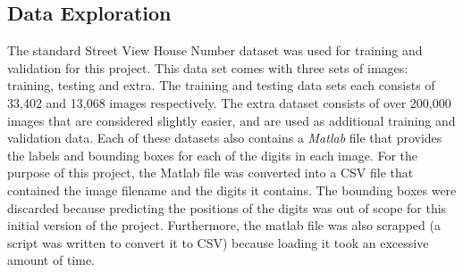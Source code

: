\documentclass[12pt]{article}
\begin{document}
\subsection{Data Exploration}
The standard Street View House Number dataset\cite{svhn_dataset} was used for training and validation for this project. 
This data set comes with three sets of images: training, testing and extra. 
The training and testing data sets each consists of 33,402 and 13,068 images respectively. 
The extra dataset consists of over 200,000 images that are considered slightly easier, and are used as additional training and validation data. 
Each of these datasets also contains a \textit{Matlab} file that provides the labels and bounding boxes for each of the digits in each image.
For the purpose of this project, the Matlab file was converted into a CSV file that contained the image filename and the digits it contains. 
The bounding boxes were discarded because predicting the positions of the digits was out of scope for this initial version of the project. 
Furthermore, the matlab file was also scrapped (a script was written to convert it to CSV) because loading it took an excessive amount of time.
\end{document}
